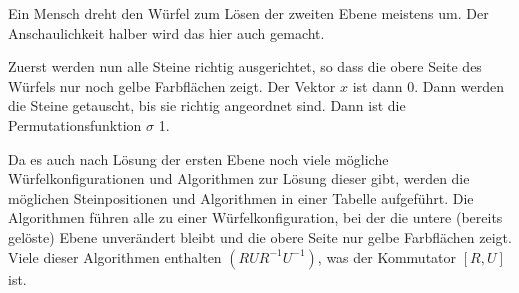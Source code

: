 \documentclass[12pt,a4paper, usenames, dvipsnames]{article}
\theoremstyle{mystyle}
\theoremstyle{definition}
\begin{document}
Ein Mensch dreht den Würfel zum Lösen der zweiten Ebene meistens um. Der Anschaulichkeit halber wird das hier auch gemacht.

Zuerst werden nun alle Steine richtig ausgerichtet, so dass die obere Seite des Würfels nur noch gelbe Farbflächen zeigt. Der Vektor $x$ ist dann $0$. Dann werden die Steine getauscht, bis sie richtig angeordnet sind. Dann ist die Permutationsfunktion $\sigma$ 1.

Da es auch nach Lösung der ersten Ebene noch viele mögliche Würfelkonfigurationen und Algorithmen zur Lösung dieser gibt, werden die möglichen Steinpositionen und Algorithmen in einer Tabelle aufgeführt. Die Algorithmen führen alle zu einer Würfelkonfiguration, bei der die untere (bereits gelöste) Ebene unverändert bleibt und die obere Seite nur gelbe Farbflächen zeigt.
Viele dieser Algorithmen enthalten $(R U R^{-1} U^{-1})$, was der Kommutator $[ R,U ]$ ist.
\end{document}
